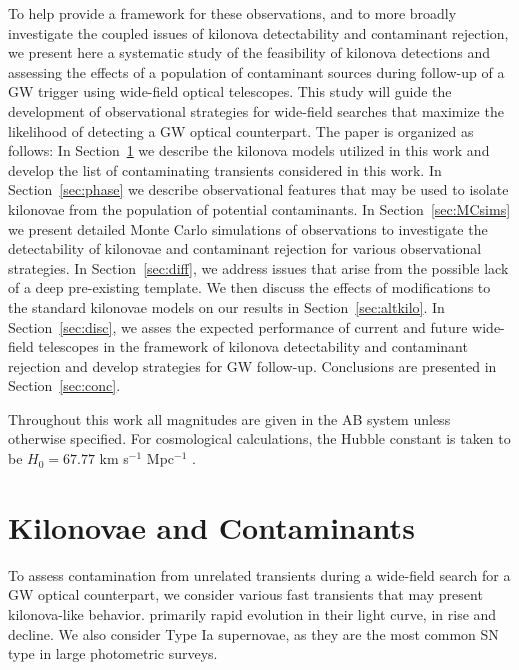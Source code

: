 To help provide a framework for these observations, and to more broadly investigate the coupled issues of kilonova detectability and contaminant rejection, we present here a systematic study of the feasibility of kilonova detections and assessing the effects of a population of contaminant sources during follow-up of a GW trigger using wide-field optical telescopes. This study will guide the development of observational strategies for wide-field searches that maximize the likelihood of detecting a GW optical counterpart. The paper is organized as follows: In Section~\ref{sec:contaminants} we describe the kilonova models utilized in this work and develop the list of contaminating transients considered in this work. In Section~\ref{sec:phase} we  describe observational features that may be used to isolate kilonovae from the population of potential contaminants. In Section~\ref{sec:MCsims} we present detailed Monte Carlo simulations of observations to investigate the detectability of kilonovae and contaminant rejection for various observational strategies. In Section~\ref{sec:diff}, we address issues that arise from the possible lack of a deep pre-existing template. We then discuss the effects of modifications to the standard kilonovae models on our results in Section~\ref{sec:altkilo}. In Section~\ref{sec:disc}, we asses the expected performance of current and future wide-field telescopes in the framework of kilonova detectability and contaminant rejection and develop strategies for GW follow-up. Conclusions are presented in Section~\ref{sec:conc}.

Throughout this work all magnitudes are given in the AB system unless otherwise specified. For cosmological calculations, the Hubble constant is taken to be $H_0 = 67.77$ km s$^{-1}$ Mpc$^{-1}$ \citep{Planck2014}. 

\section{Kilonovae and Contaminants}
\label{sec:contaminants}

To assess contamination from unrelated transients during a wide-field search for a GW optical counterpart, we consider various fast transients that may present kilonova-like behavior. primarily rapid evolution in their light curve, in rise and decline. We also consider Type Ia supernovae, as they are the most common SN type in large photometric surveys.

